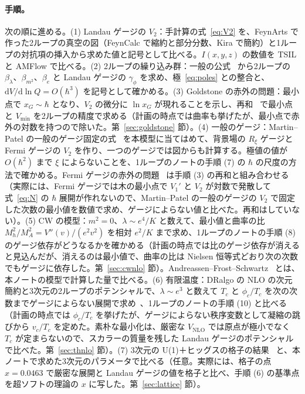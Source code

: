 \documentclass[a4paper,10pt]{ltjsarticle}
\newcommand{\dd}{\mathrm{d}}
\begin{document}
\paragraph{手順。}次の順に進める。(1) Landau ゲージの $V_2$：手計算の式~\eqref{eq:V2} を、FeynArts で作った2ループの真空の図（FeynCalc で縮約と部分分数、Kira で簡約）と1ループの対抗項の挿入から求めた値と記号として比べる。$I(x,y,z)$ の数値を TSIL と AMFlow で比べる。(2) 2ループの繰り込み群：一般の公式~\cite{mv83,lwx03} から2ループの $\beta_\lambda$、$\beta_{m^2}$、$\beta_e$ と Landau ゲージの $\gamma_\phi$ を求め、極~\eqref{eq:poles} との整合と、$\dd V/\dd\ln Q=O(\hbar^3)$ を記号として確かめる。(3) Goldstone の赤外の問題：最小点で $x_G\sim\hbar$ となり、$V_2$ の微分に $\ln x_G$ が現れることを示し、再和~\cite{martin14,eek14} で最小点と $V_{\min}$ を2ループの精度で求める（計画の時点では曲率も挙げたが、最小点で赤外の対数を持つので除いた。第~\ref{sec:goldstone} 節）。(4) 一般のゲージ：Martin--Patel の一般のゲージ固定の式~\cite{mp18} を本模型に当てはめて、背景場の $R_\xi$ ゲージと Fermi ゲージの $V_2$ を作り、一つのゲージでは図からも計算する。極値の値が $O(\hbar^2)$ まで $\xi$ によらないことを、1ループのノートの手順 (7) の $\hbar$ の尺度の方法で確かめる。Fermi ゲージの赤外の問題~\cite{egk16} は手順 (3) の再和と組み合わせる（実際には、Fermi ゲージでは木の最小点で $V_1'$ と $V_2$ が対数で発散して式~\eqref{eq:N} の $\hbar$ 展開が作れないので、Martin--Patel の一般のゲージの $V_2$ で固定した次数の最小値を数値で求め、ゲージによらない値と比べた。再和はしていない）。(5) CW の模型：$m^2=0$、$\lambda\sim e^4/K$ と数えて、最小値と曲率の比 $M_h^2/M_A^2=V''(v)/(e^2v^2)$ を相対 $e^2/K$ まで求め、1ループのノートの手順 (8) のゲージ依存がどうなるかを確かめる（計画の時点では比のゲージ依存が消えると見込んだが、消えるのは最小値で、曲率の比は Nielsen 恒等式どおり次の次数でもゲージに依存した。第~\ref{sec:cwnlo} 節）。Andreassen--Frost--Schwartz~\cite{afs15} とは、本ノートの模型で計算した量で比べる。(6) 有限温度：DRalgo の NLO の次元簡約と3次元の2ループのポテンシャルで、$\lambda\sim e^3$ と数えて $T_c$ と $\phi_c/T_c$ を次の次数までゲージによらない展開で求め~\cite{el20}、1ループのノートの手順 (10) と比べる（計画の時点では $\phi_c/T_c$ を挙げたが、ゲージによらない秩序変数として凝縮の跳びから $v_c/T_c$ を定めた。素朴な最小化は、厳密な $V_{\mathrm{NLO}}$ では原点が極小でなく $T_c$ が定まらないので、スカラーの質量を残した Landau ゲージのポテンシャルで比べた。第~\ref{sec:thnlo} 節）。(7) 3次元の U(1)＋ヒッグスの格子の結果~\cite{kklp98} と、本ノートで求めた3次元のパラメータで比べる（任意。実際には、格子の点 $x=0.0463$ で厳密な展開と Landau ゲージの値を格子と比べ、手順 (6) の基準点を超ソフトの理論の $x$ に写した。第~\ref{sec:lattice} 節）。
\end{document}
